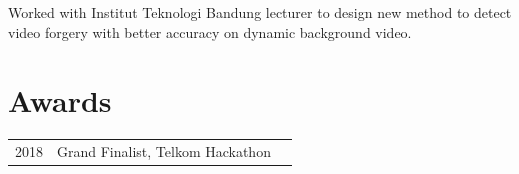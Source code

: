 \documentclass[a4paper]{deedy-resume} %
\begin{document}
\begin{minipage}[t]{0.66\textwidth}
Worked with Institut Teknologi Bandung lecturer to design new method to detect video forgery with better accuracy on dynamic background video.

\sectionspace %


\section{Awards} 

\begin{tabular}{rll}
2018	 & Grand Finalist, Telkom Hackathon\\
\end{tabular}


\end{minipage} %








\end{document}
